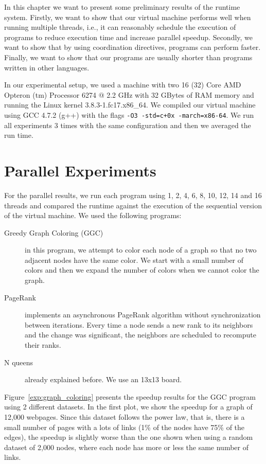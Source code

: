 In this chapter we want to present some preliminary results of the \lang runtime system.
Firstly, we want to show that our virtual machine performs well when running multiple threads,
i.e., it can reasonably schedule the execution of programs to reduce execution time and increase parallel speedup. Secondly, we want to show that by using coordination directives, programs can perform faster.
Finally, we want to show that our programs are usually shorter than programs written in other languages.  

In our experimental setup, we used a machine 
with two 16 (32) Core AMD Opteron
(tm) Processor 6274 $@$ 2.2 GHz with 32 GBytes of RAM memory and running the Linux
kernel 3.8.3-1.fc17.x86\_64.
     We compiled our virtual machine using GCC 4.7.2 (g++) with the flags \texttt{-O3 -std=c+0x -march=x86-64}.
     We run all experiments 3 times with the same configuration and then we averaged the run time.

\section{Parallel Experiments}

For the parallel results, we run each program using 1, 2, 4, 6, 8, 10, 12, 14 and 16 threads and compared the runtime against the execution of the sequential version of the virtual machine. We used the following programs:

\newcommand{\figsize}[0]{6.5cm}
\captionsetup[sub]{              %
       font=scriptsize}

\begin{description}
   \item[Greedy Graph Coloring (GGC)] in this program, we attempt to color each node of a graph so that no two adjacent nodes have the same color. We start with a small number of colors and then we expand the number of colors when we cannot color the graph.
   \item[PageRank] implements an asynchronous PageRank algorithm without synchronization between iterations. Every time a node sends a new rank to its neighbors and the change was significant, the neighbors are scheduled to recompute their ranks.
   \item[N queens] already explained before. We use an 13x13 board.
\end{description}

Figure~\ref{exp:graph_coloring} presents the speedup results for the GGC program using 2 different datasets. In the first plot, we show the speedup for a graph of 12,000 webpages. Since this dataset follows the power law, that is, there is a small number of pages with a lots of links (1\% of the nodes have 75\% of the edges), the speedup is slightly worse than the one shown when using a random dataset of 2,000 nodes, where each node has more or less the same number of links.


